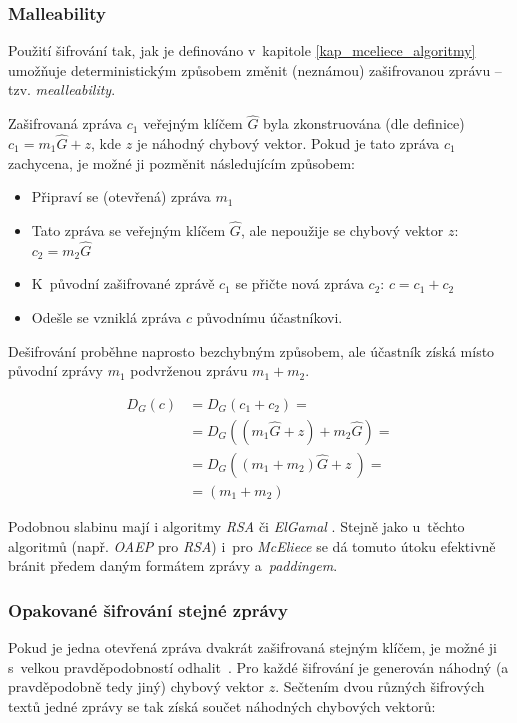\documentclass[thesis=M,czech,hidelinks]{FITthesis}[2012/06/26]
\newcommand{\0}{{\textcolor[gray]{0.80}{0}}}
\begin{document}
\subsubsection{Malleability}

Použití šifrování tak, jak je definováno v~kapitole \ref{kap_mceliece_algoritmy}
umožňuje deterministickým způsobem změnit (neznámou) zašifrovanou zprávu -- tzv.
\emph{mealleability}.

Zašifrovaná zpráva $c_1$ veřejným klíčem $\hat{G}$ byla zkonstruována (dle
definice) $c_1 = m_1\hat{G} + z$, kde $z$ je náhodný chybový vektor. Pokud je
tato zpráva $c_1$ zachycena, je možné ji pozměnit následujícím způsobem:

\begin{itemize}
    \item Připraví se (otevřená) zpráva $m_1$
    \item Tato zpráva se  veřejným klíčem $\hat{G}$, ale nepoužije
        se chybový vektor $z$: $c_2 = m_2\hat{G}$
    \item K~původní zašifrované zprávě $c_1$ se přičte nová zpráva $c_2$:
        $c = c_1 + c_2$
    \item Odešle se vzniklá zpráva $c$ původnímu účastníkovi.
\end{itemize}

Dešifrování proběhne naprosto bezchybným způsobem, ale účastník získá místo
původní zprávy $m_1$ podvrženou zprávu $m_1+m_2$.

\begin{align*}
    D_G\left(c\right) &= D_G\left( c_1 + c_2 \right) = \\
                      &= D_G\left( (m_1\hat{G} + z) + m_2\hat{G} \right) = \\
                      &= D_G\left( (m_1+m_2)\hat{G} + z~\right) =\\
                      &= (m_1+m_2)
\end{align*}

Podobnou slabinu mají i algoritmy \emph{RSA} či \emph{ElGamal} \cite{FIT_KRY}.
Stejně jako u~těchto algoritmů (např. \emph{OAEP} pro \emph{RSA}) i~pro
\emph{McEliece} se dá tomuto útoku efektivně bránit předem daným formátem zprávy
a~\emph{paddingem}.

\subsubsection{Opakované šifrování stejné zprávy}

Pokud je jedna otevřená zpráva dvakrát zašifrovaná stejným klíčem, je možné ji
s~velkou pravděpodobností odhalit~\cite{Berson}. Pro každé šifrování je
generován náhodný (a pravděpodobně tedy jiný) chybový vektor $z$. Sečtením dvou
různých šifrových textů jedné zprávy se tak získá součet náhodných chybových
vektorů:
\end{document}
